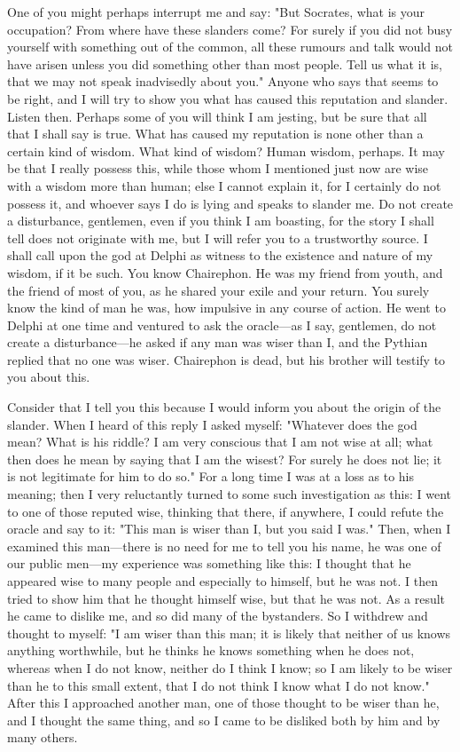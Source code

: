 One of you might perhaps interrupt me and say: "But Socrates, what is your occupation? From
where have these slanders come? For surely if you did not busy yourself with something out of the
common, all these rumours and talk would not have arisen unless you did something other than
most people. Tell us what it is, that we may not speak inadvisedly about you." Anyone who says
that seems to be right, and I will try to show you what has caused this reputation and slander.
Listen then. Perhaps some of you will think I am jesting, but be sure that all that I shall say is true.
What has caused my reputation is none other than a certain kind of wisdom. What kind of wisdom?
Human wisdom, perhaps. It may be that I really possess this, while those whom I mentioned just
now are wise with a wisdom more than human; else I cannot explain it, for I certainly do not
possess it, and whoever says I do is lying and speaks to slander me. Do not create a disturbance,
gentlemen, even if you think I am boasting, for the story I shall tell does not originate with me, but
I will refer you to a trustworthy source. I shall call upon the god at Delphi as witness to the
existence and nature of my wisdom, if it be such. You know Chairephon. He was my friend from
youth, and the friend of most of you, as he shared your exile and your return. You surely know the
kind of man he was, how impulsive in any course of action. He went to Delphi at one time and
ventured to ask the oracle—as I say, gentlemen, do not create a disturbance—he asked if any man
was wiser than I, and the Pythian replied that no one was wiser. Chairephon is dead, but his
brother will testify to you about this.

Consider that I tell you this because I would inform you about the origin of the slander. When
I heard of this reply I asked myself: "Whatever does the god mean? What is his riddle? I am very
conscious that I am not wise at all; what then does he mean by saying that I am the wisest? For
surely he does not lie; it is not legitimate for him to do so." For a long time I was at a loss as to his
meaning; then I very reluctantly turned to some such investigation as this: I went to one of those
reputed wise, thinking that there, if anywhere, I could refute the oracle and say to it: "This man
is wiser than I, but you said I was." Then, when I examined this man—there is no need for me to
tell you his name, he was one of our public men—my experience was something like this: I
thought that he appeared wise to many people and especially to himself, but he was not. I then
tried to show him that he thought himself wise, but that he was not. As a result he came to dislike
me, and so did many of the bystanders. So I withdrew and thought to myself: "I am wiser than this
man; it is likely that neither of us knows anything worthwhile, but he thinks he knows something
when he does not, whereas when I do not know, neither do I think I know; so I am likely to be
wiser than he to this small extent, that I do not think I know what I do not know." After this I
approached another man, one of those thought to be wiser than he, and I thought the same thing,
and so I came to be disliked both by him and by many others.

